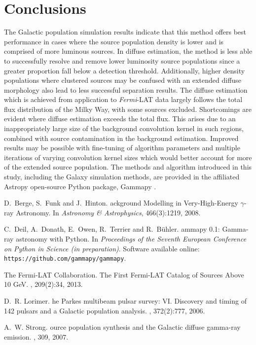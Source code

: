 \documentclass{PoS}
\begin{document}
\section{Conclusions}

The Galactic population simulation results indicate that this method offers best performance in cases where the source population density is lower and is comprised of more luminous sources. In diffuse estimation, the method is less able to successfully resolve and remove lower luminosity source populations since a greater proportion fall below a detection threshold. Additionally, higher density populations where clustered sources may be confused with an extended diffuse morphology also lead to less successful separation results. The diffuse estimation which is achieved from application to \textit{Fermi}-LAT data largely follows the total flux distribution of the Milky Way, with some sources excluded. Shortcomings are evident where diffuse estimation exceeds the total flux. This arises due to an inappropriately large size of the background convolution kernel in such regions, combined with source contamination in the background estimation. Improved results may be possible with fine-tuning of algorithm parameters and multiple iterations of varying convolution kernel sizes which would better account for more of the extended source population. The methods and algorithm introduced in this study, including the Galaxy simulation methods, are provided in the affiliated Astropy open-source Python package, Gammapy \cite{Deil}.

\begin{thebibliography}{99}

D.~Berge, S.~Funk and J.~Hinton.
ackground {M}odelling in {V}ery-{H}igh-{E}nergy $\gamma$-ray {A}stronomy.
\newblock In {\em {A}stronomy \& {A}strophysics}, 466(3):1219, 2008.

C.~Deil, A.~Donath, E.~Owen, R.~Terrier and R.~B{\"{u}}hler.
ammapy {0.1}: {G}amma-ray astronomy with {P}ython.
\newblock In {\em {P}roceedings of the {S}eventh {E}uropean {C}onference on
  {P}ython in {S}cience (in preparation)}.
\newblock Software available online: {\verb|https://github.com/gammapy/gammapy|}.

{The Fermi-LAT Collaboration}.
\newblock The {F}irst {Fermi-LAT} {C}atalog of {S}ources {A}bove 10 {GeV}.
, 209(2):34, 2013.

D.~R. Lorimer.
he {P}arkes multibeam pulsar survey: {VI.} {D}iscovery and timing
  of 142 pulsars and a {G}alactic population analysis.
, 372(2):777,
  2006.

A.~W. Strong.
ource population synthesis and the {G}alactic diffuse gamma-ray
  emission.
, 309, 2007.


\end{thebibliography}
\end{document}
